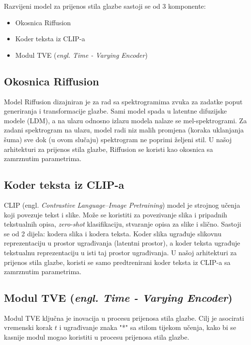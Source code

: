 

Razvijeni model za prijenos stila glazbe sastoji se od 3 komponente:
\begin{itemize}
  \item Okosnica Riffusion 
  \item Koder teksta iz CLIP-a
  \item Modul TVE (\textit{engl. Time - Varying Encoder})
\end{itemize}

\subsection{Okosnica Riffusion}
Model Riffusion\cite{forsgren2022riffusion} dizajniran je za rad sa spektrogramima zvuka za zadatke poput generiranja i transformacije glazbe. Sami model spada u latentne difuzijske modele (LDM), a na ulazu odnosno izlazu modela nalaze se mel-spektrogrami. Za zadani spektrogram na ulazu, model radi niz malih promjena (koraka uklanjanja šuma) sve dok (u ovom slučaju) spektrogram ne poprimi željeni stil. U našoj arhitekturi za prijenos stila glazbe, Riffusion se koristi kao okosnica sa zamrznutim parametrima.

\subsection{Koder teksta iz CLIP-a}
CLIP (engl. \textit{Contrastive Language–Image Pretraining})\cite{radford2021learning} model je strojnog učenja koji povezuje tekst i slike. Može se koristiti za povezivanje slika i pripadnih tekstualnih opisa, \textit{zero-shot} klasifikaciju, stvaranje opisa za slike i slično. Sastoji se od 2 dijela: kodera slika i kodera teksta. Koder slika ugrađuje slikovnu reprezentaciju u prostor ugrađivanja (latentni prostor), a koder teksta ugrađuje tekstualnu reprezentaciju u isti taj prostor ugrađivanja. U našoj arhitekturi za prijenos stila glazbe, koristi se samo predtrenirani koder teksta iz CLIP-a sa zamrznutim parametrima. 

\subsection{Modul TVE (\textit{engl. Time - Varying Encoder})}
Modul TVE ključna je inovacija u procesu prijenosa stila glazbe. Cilj je asocirati vremenski korak $t$ i ugrađivanje znaka "*" sa stilom tijekom učenja, kako bi se kasnije modul mogao koristiti u procesu prijenosa stila glazbe.


